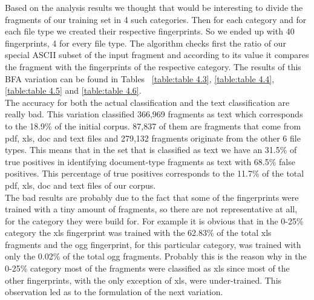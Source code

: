 Based on the analysis results  we thought that would be interesting to divide the fragments of our training set in 4 such categories. Then for each category and for each file type we created their respective fingerprints. So we ended up with 40 fingerprints, 4 for every file type. The algorithm checks first the ratio of our special ASCII subset of the input fragment and according to its value it compares the fragment with the fingerprints of the respective category. The results of this BFA variation can be found in Tables ~\ref{table:table 4.3}, \ref{table:table 4.4}, \ref{table:table 4.5} and \ref{table:table 4.6}.\\ The accuracy for both the actual classification and the text classification are really bad. This variation classified 366,969 fragments as text which corresponds to the 18.9\% of the initial corpus. 87,837 of them are fragments that come from pdf, xls, doc and text files and 279,132 fragments originate from the other 6 file types. This means that in the set that is classified as text we have an 31.5\% of true positives in identifying document-type fragments as text with 68.5\% false positives. This percentage of true positives corresponds to the 11.7\% of the total pdf, xls, doc and text files of our corpus.\\


 The bad results are probably due to the fact that some of the fingerprints were trained with a tiny amount of fragments, so there are not representative at all, for the category they were build for. For example it is obvious that in the 0-25\% category the xls fingerprint was trained with the 62.83\% of the total xls fragments and the ogg fingerprint, for this particular category, was trained with only the 0.02\% of the total ogg fragments. Probably this is the reason why in the 0-25\% category most of the fragments were classified as xls since most of the other fingerprints, with the only exception of xls, were under-trained. This observation led as to the formulation of the next variation.




